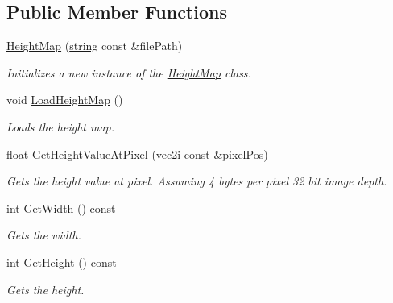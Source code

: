 \subsection*{Public Member Functions}
\begin{DoxyCompactItemize}
\item 
\hyperlink{class_height_map_a5a81f55f25aca424c9b9afddab239596}{Height\+Map} (\hyperlink{_types_8h_ad453f9f71ce1f9153fb748d6bb25e454}{string} const \&file\+Path)
\begin{DoxyCompactList}\small\item\em Initializes a new instance of the \hyperlink{class_height_map}{Height\+Map} class. \end{DoxyCompactList}\item 
void \hyperlink{class_height_map_af4faa63fa0dfe8386342e45127d708d4}{Load\+Height\+Map} ()
\begin{DoxyCompactList}\small\item\em Loads the height map. \end{DoxyCompactList}\item 
float \hyperlink{class_height_map_a895733b01397c21c3562e748267da822}{Get\+Height\+Value\+At\+Pixel} (\hyperlink{_types_8h_abf8f3dd1636a08cb074d661110e0f4c0}{vec2i} const \&pixel\+Pos)
\begin{DoxyCompactList}\small\item\em Gets the height value at pixel. Assuming 4 bytes per pixel 32 bit image depth. \end{DoxyCompactList}\item 
int \hyperlink{class_height_map_a85709e10bb08442730bfddb649a86e0b}{Get\+Width} () const 
\begin{DoxyCompactList}\small\item\em Gets the width. \end{DoxyCompactList}\item 
int \hyperlink{class_height_map_a4c1243d24a8c5d039ea967a57a7bf462}{Get\+Height} () const 
\begin{DoxyCompactList}\small\item\em Gets the height. \end{DoxyCompactList}\end{DoxyCompactItemize}
